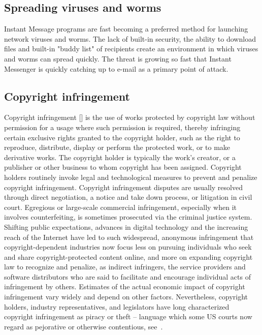 \subsection{Spreading viruses and worms}\label{subsec:spreading-viruses-and-worms}
Instant Message programs are fast becoming a preferred method for launching network viruses and worms.
The lack of built-in security, the ability to download files and built-in "buddy list" of recipients create an
environment in which viruses and worms can spread quickly.
The threat is growing so fast that Instant Messenger is quickly catching up to e-mail as a primary point of attack.

\subsection{Copyright infringement}\label{subsec:copyright-infringement}
Copyright infringement [\cite{hardy2002criminal}] is the use of works protected by copyright law without
permission for a usage where such permission is required, thereby infringing certain exclusive rights granted to the
copyright holder, such as the right to reproduce, distribute, display or perform the protected work, or to make
derivative works.
The copyright holder is typically the work's creator, or a publisher or other business to whom copyright has been assigned.
Copyright holders routinely invoke legal and technological measures to prevent and penalize copyright infringement.
Copyright infringement disputes are usually resolved through direct negotiation, a notice and take down process, or
litigation in civil court.
Egregious or large-scale commercial infringement, especially when it involves counterfeiting, is sometimes prosecuted
via the criminal justice system.
Shifting public expectations, advances in digital technology and the increasing reach of the Internet have led to such
widespread, anonymous infringement that copyright-dependent industries now focus less on pursuing individuals who seek
and share copyright-protected content online, and more on expanding copyright law to recognize and
penalize, as indirect infringers, the service providers and software distributors who are said to facilitate and
encourage individual acts of infringement by others.
Estimates of the actual economic impact of copyright infringement vary widely and depend on other factors.
Nevertheless, copyright holders, industry representatives, and legislators have long characterized copyright
infringement as piracy or theft -- language which some US courts now regard as pejorative or otherwise contentious,
see~\cite{powell1984dowling, li2009intellectual}.


